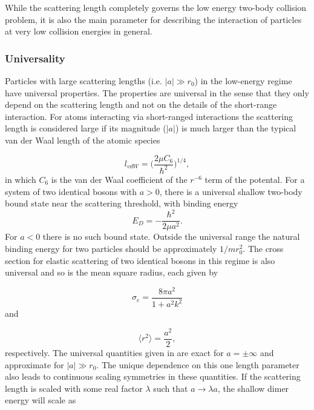 \documentclass{article}
\providecommand{\abs}[1]{\lvert#1\rvert} \providecommand{\norm}[1]{\lVert#1\rVert}
\numberwithin{equation}{section}
\begin{document}
While the scattering length completely governs the low energy two-body collision problem, it is also the main parameter for describing the interaction of particles at very low collision energies in general. 

\subsubsection{Universality}
Particles with large scattering lengths (i.e. $\abs{a}\gg r_0$) in the low-energy regime have universal properties. The properties are universal in the sense that they only depend on the scattering length and not on the details of the short-range interaction. For atoms interacting via short-ranged interactions the scattering length is considered large if its magnitude ($\abs{a}$) is much larger than the typical van der Waal length of the atomic species

\begin{equation}
l_{vdW} = \bigg(\frac{2\mu C_6}{\hbar^2}\bigg)^{1/4},
\end{equation}
in which $C_6$ is the van der Waal coefficient of the $r^{-6}$ term of the potental. For a system of two identical bosons with $a>0$, there is a universal shallow two-body bound state near the scattering threshold, with binding energy 
\begin{equation}\label{shallowdimer}
E_D = -\frac{\hbar^2}{2 \mu a^2}.
\end{equation}
For $a<0$ there is no such bound state. Outside the universal range the natural binding energy for two particles should be approximately $1/mr_0^2$. The cross section for elastic scattering of two identical bosons in this regime is also universal and so is the mean square radius, each given by

\begin{equation}\label{elasticcross}
\sigma_e = \frac{8\pi a^2}{1 + a^2k^2}
\end{equation}
and

\begin{equation}\label{meanradius}
\langle r^2\rangle = \frac{a^2}{2},
\end{equation}
respectively. The universal quantities given in  are exact for $a=\pm \infty$ and approximate for $\abs{a}\gg r_0$. The unique dependence on this one length parameter also leads to continuous scaling symmetries in these quantities. If the scattering length is scaled with some real factor $\lambda$ such that $a \to \lambda a$, the shallow dimer energy will scale as 
\end{document}

